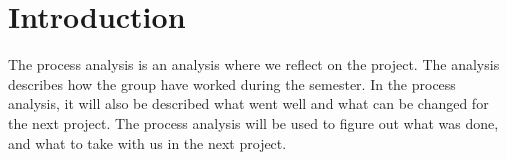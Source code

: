 \chapter{Introduction}
The process analysis is an analysis where we reflect on the project. The analysis describes how the group have worked during the semester. In the process analysis, it will also be described what went well and what can be changed for the next project. The process analysis will be used to figure out what was done, and what to take with us in the next project. 
